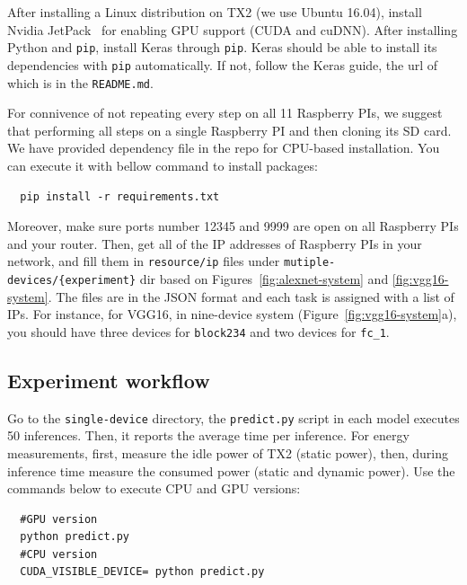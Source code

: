 \documentclass[sigplan]{acmart}
\begin{document}
 After installing a Linux distribution on TX2 (we use Ubuntu 16.04), install Nvidia JetPack~\cite{jetpack} for enabling GPU support (CUDA and cuDNN). After installing Python and \texttt{pip}, install Keras through \texttt{pip}. Keras should be able to install its dependencies with \texttt{pip} automatically. If not, follow the Keras guide, the url of which is in the \texttt{README.md}.

 For connivence of not repeating every step on all 11 Raspberry PIs, we suggest that performing all steps on a single Raspberry PI and then cloning its SD card. We have provided dependency file in the repo for CPU-based installation. You can execute it with bellow command to install packages:
\begin{lstlisting}
  pip install -r requirements.txt
\end{lstlisting}

\noindent Moreover, make sure ports number 12345 and 9999 are open on all Raspberry PIs and your router. Then, get all of the IP addresses of Raspberry PIs in your network, and fill them in \texttt{resource/ip} files under \texttt{mutiple-devices/\{experiment\}} dir based on Figures~\ref{fig:alexnet-system} and \ref{fig:vgg16-system}. The files are in the JSON format and each task is assigned with a list of IPs. For instance, for VGG16, in nine-device system (Figure~\ref{fig:vgg16-system}a), you should have three devices for \texttt{block234} and two devices for \texttt{fc\_1}.


\subsection{Experiment workflow}

 Go to the \texttt{single-device} directory, the \texttt{predict.py} script in each model executes 50 inferences. Then, it reports the average time per inference. For energy measurements, first, measure the idle power of TX2 (static power), then, during inference time measure the consumed power (static and dynamic power). Use the commands below to execute CPU and GPU versions:
\begin{lstlisting}
  #GPU version
  python predict.py
  #CPU version
  CUDA_VISIBLE_DEVICE= python predict.py
\end{lstlisting}
\end{document}
